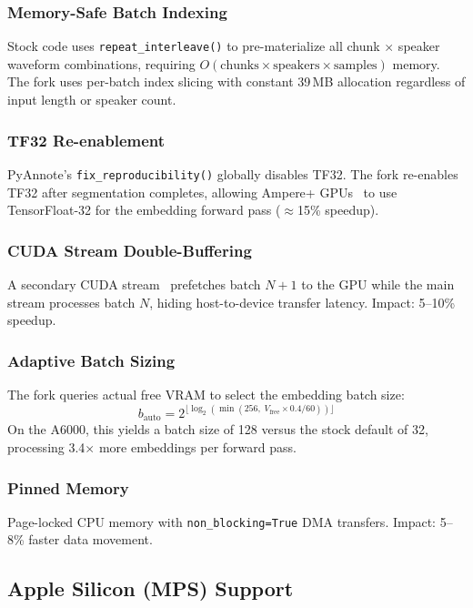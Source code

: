 \documentclass[conference,10pt]{IEEEtran}
\begin{document}
\subsubsection{Memory-Safe Batch Indexing}
Stock code uses \texttt{repeat\_interleave()} to pre-materialize all chunk
$\times$ speaker waveform combinations, requiring
$O(\text{chunks} \times \text{speakers} \times \text{samples})$ memory. The
fork uses per-batch index slicing with constant 39\,MB allocation regardless of
input length or speaker count.

\subsubsection{TF32 Re-enablement}
PyAnnote's \texttt{fix\_reproducibility()} globally disables TF32. The fork
re-enables TF32 after segmentation completes, allowing Ampere+
GPUs~\cite{nvidia2020ampere} to use TensorFloat-32 for the embedding forward
pass ($\approx$15\% speedup).

\subsubsection{CUDA Stream Double-Buffering}
A secondary CUDA stream~\cite{nvidia2024cuda} prefetches batch $N\!+\!1$ to the
GPU while the main stream processes batch $N$, hiding host-to-device transfer
latency. Impact: 5--10\% speedup.

\subsubsection{Adaptive Batch Sizing}
The fork queries actual free VRAM to select the embedding batch size:
\begin{equation}
  b_{\text{auto}} = 2^{\lfloor\log_2(\min(256,\; V_{\text{free}} \times 0.4 / 60))\rfloor}
  \label{eq:adaptivebatch}
\end{equation}
On the A6000, this yields a batch size of 128 versus the stock default of 32,
processing 3.4$\times$ more embeddings per forward pass.

\subsubsection{Pinned Memory}
Page-locked CPU memory with \texttt{non\_blocking=True} DMA transfers.
Impact: 5--8\% faster data movement.

\subsection{Apple Silicon (MPS) Support}
\end{document}
